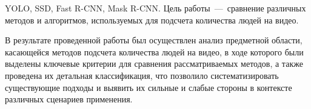 \begin{essay}{YOLO, SSD, Fast R-CNN, Mask R-CNN.}
	Цель работы~---~сравнение различных методов и алгоритмов, используемых для подсчета количества людей на видео.
	
    В результате проведенной работы был осуществлен анализ предметной области, касающейся методов подсчета количества людей на видео, в ходе которого были выделены ключевые критерии для сравнения рассматриваемых методов, а также проведена их детальная классификация, что позволило систематизировать существующие подходы и выявить их сильные и слабые стороны в контексте различных сценариев применения.
\end{essay}